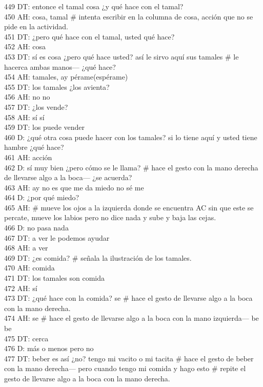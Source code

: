 449 DT: entonce el tamal cosa ¿y qué hace con el tamal?\\
450 AH: cosa, tamal \# intenta escribir en la columna de cosa, acción que no se pide en la actividad.\\
451 DT: ¿pero qué hace con el tamal, usted qué hace?\\
452 AH: cosa\\
453 DT: sí es cosa ¿pero qué hace usted? así le sirvo aquí sus tamales \# le hacerca ambas manos--- ¿qué hace?\\
454 AH: tamales, ay pérame(espérame)\\
455 DT: los tamales ¿los avienta?\\
456 AH: no no\\
457 DT: ¿los vende?\\
458 AH: sí sí\\
459 DT: los puede vender\\
460 D: ¿qué otra cosa puede hacer con los tamales? si lo tiene aquí y usted tiene hambre ¿qué hace?\\
461 AH: acción\\
462 D: sí muy bien ¿pero cómo se le llama? \# hace el gesto con la mano derecha de llevarse algo a la boca--- ¿se acuerda? \\
463 AH: ay no es que me da miedo no sé me \\
464 D: ¿por qué miedo?\\
465 AH: \# mueve los ojos a la izquierda donde se encuentra AC sin que este se percate, mueve los labios pero no dice nada y sube y baja las cejas.\\
466 D: no pasa nada\\
467 DT: a ver le podemos ayudar\\
468 AH: a ver\\
469 DT: ¿es comida? \# señala la ilustración de los tamales.\\
470 AH: comida\\
471 DT: los tamales son comida\\
472 AH: sí\\
473 DT: ¿qué hace con la comida? se \# hace el gesto de llevarse algo a la boca con la mano derecha.\\
474 AH: se \# hace el gesto de llevarse algo a la boca con la mano izquierda--- be be\\
475 DT: cerca\\
476 D: más o menos pero no\\
477 DT: beber es así ¿no? tengo mi vacito o mi tacita \# hace el gesto de beber con la mano derecha--- pero cuando tengo mi comida y hago esto \# repite el gesto de llevarse algo a la boca con la mano derecha.\\
